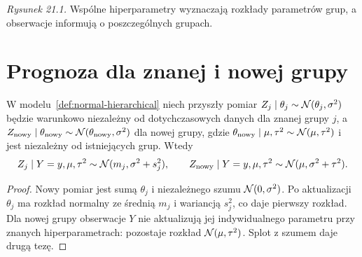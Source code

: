 \Needspace{92mm}
\begin{center}

{\small\emph{Rysunek 21.1.} Wspólne hiperparametry wyznaczają rozkłady parametrów grup, a obserwacje informują o poszczególnych grupach.}
\end{center}

\section{Prognoza dla znanej i nowej grupy}
\begin{twierdzenie}
\label{thm:hierarchical-predictive}
W modelu~\ref{def:normal-hierarchical} niech przyszły pomiar
$Z_j\mid\theta_j\sim\mathcal N(\theta_j,\sigma^2)$ będzie warunkowo
niezależny od dotychczasowych danych dla znanej grupy $j$,
a $Z_{\rm nowy}\mid\theta_{\rm nowy}\sim\mathcal N(\theta_{\rm nowy},\sigma^2)$
dla nowej grupy, gdzie $\theta_{\rm nowy}\mid\mu,\tau^2\sim\mathcal N(\mu,\tau^2)$
i jest niezależny od istniejących grup. Wtedy
\[
 Z_j\mid Y=y,\mu,\tau^2\sim\mathcal N(m_j,\sigma^2+s_j^2),
 \qquad Z_{\rm nowy}\mid Y=y,\mu,\tau^2\sim\mathcal N(\mu,\sigma^2+\tau^2).
\]
\end{twierdzenie}
\begin{proof}
Nowy pomiar jest sumą $\theta_j$ i niezależnego
szumu $\mathcal N(0,\sigma^2)$. Po aktualizacji $\theta_j$
ma rozkład normalny ze średnią $m_j$ i wariancją $s_j^2$,
co daje pierwszy rozkład. Dla nowej grupy obserwacje
$Y$ nie aktualizują jej indywidualnego parametru przy
znanych hiperparametrach: pozostaje rozkład
$\mathcal N(\mu,\tau^2)$. Splot z szumem daje drugą tezę.
\end{proof}

